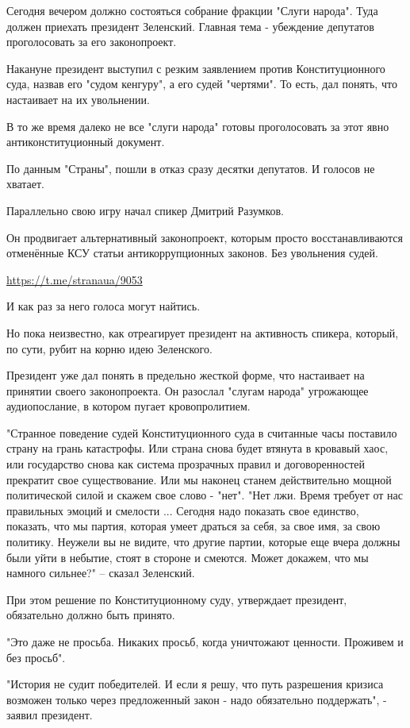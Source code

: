Сегодня вечером должно состояться собрание фракции "Слуги народа". Туда должен
приехать президент Зеленский. Главная тема - убеждение депутатов проголосовать
за его законопроект.

Накануне президент выступил с резким заявлением против Конституционного суда,
назвав его "судом кенгуру", а его судей "чертями". То есть, дал понять, что
настаивает на их увольнении.

В то же время далеко не все "слуги народа" готовы проголосовать за этот явно
антиконституционный документ.

По данным "Страны", пошли в отказ сразу десятки депутатов. И голосов не
хватает.

Параллельно свою игру начал спикер Дмитрий Разумков.  

Он продвигает альтернативный законопроект, которым просто восстанавливаются
отменённые КСУ статьи антикоррупционных законов. Без увольнения судей.

\url{https://t.me/stranaua/9053}

И как раз за него голоса могут найтись.

Но пока неизвестно, как отреагирует президент на активность спикера, который,
по сути, рубит на корню идею Зеленского.

Президент уже дал понять в предельно жесткой форме, что настаивает на принятии
своего законопроекта. Он разослал "слугам народа" угрожающее аудиопослание, в
котором пугает кровопролитием.

"Странное поведение судей Конституционного суда в считанные часы поставило
страну на грань катастрофы. Или страна снова будет втянута в кровавый хаос, или
государство снова как система прозрачных правил и договоренностей прекратит
свое существование. Или мы наконец станем действительно мощной политической
силой и скажем свое слово - "нет". "Нет лжи. Время требует от нас правильных
эмоций и смелости ... Сегодня надо показать свое единство, показать, что мы
партия, которая умеет драться за себя, за свое имя, за свою политику. Неужели
вы не видите, что другие партии, которые еще вчера должны были уйти в небытие,
стоят в стороне и смеются. Может докажем, что мы намного сильнее?" – сказал
Зеленский.

При этом решение по Конституционному суду, утверждает президент, обязательно
должно быть принято.

"Это даже не просьба. Никаких просьб, когда уничтожают ценности. Проживем и без
просьб".

"История не судит победителей. И если я решу, что путь разрешения кризиса
возможен только через предложенный закон - надо обязательно поддержать", -
заявил президент. 

